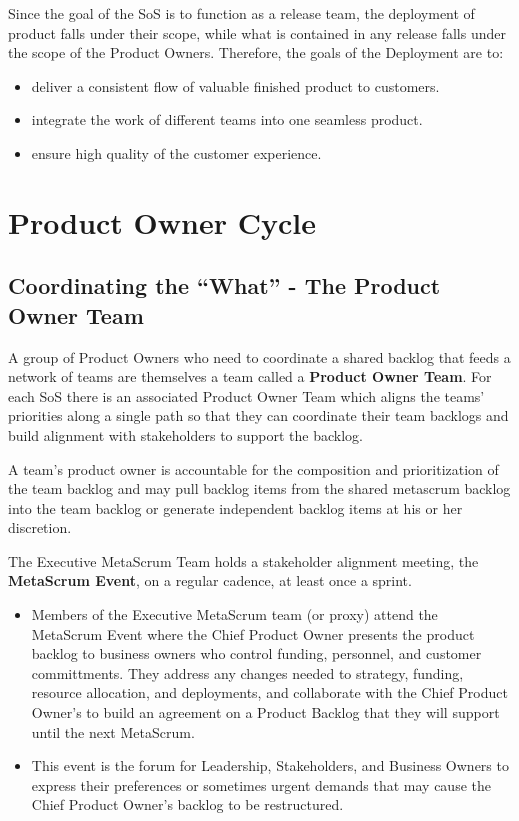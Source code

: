\documentclass[12pt,a4paper,parskip=full]{scrartcl}
\begin{document}
Since the goal of the SoS is to function as a release team, the deployment
of product falls under their scope, while what is contained in any release
falls under the scope of the Product Owners. Therefore, the goals of the
Deployment are to:
\begin{itemize}
\item deliver a consistent flow of valuable finished product to customers.
\item integrate the work of different teams into one seamless product.
\item ensure high quality of the customer experience.
\end{itemize}

\section{Product Owner Cycle}
\subsection{Coordinating the ``What'' - The Product Owner Team}
A group of Product Owners who need to coordinate a shared backlog that
feeds a network of teams are themselves a team called a \textbf{Product Owner Team}.
For each SoS there is an associated Product Owner Team which aligns the
teams' priorities along a single path so that they can coordinate their
team backlogs and build alignment with stakeholders to support the backlog.

A team's product owner is accountable for the composition and prioritization
of the team backlog and may pull backlog items from the shared metascrum backlog
into the team backlog or generate independent backlog items at his or her discretion.

The Executive MetaScrum Team holds a stakeholder alignment meeting, the \textbf{MetaScrum Event}, on a regular cadence, at least once a sprint. 
\begin{itemize}
\item Members of the Executive MetaScrum team (or proxy) attend the MetaScrum Event where the Chief Product Owner presents the product backlog to business owners who control funding, personnel, and customer committments. They address any changes needed to strategy, funding, resource allocation, and deployments, and collaborate with the Chief Product Owner's to build an agreement on a Product Backlog that they will support until the next MetaScrum.
\item This event is the forum for Leadership, Stakeholders, and Business Owners to express their preferences or sometimes urgent demands that may cause the Chief Product Owner's backlog to be restructured.
\end{itemize}
\end{document}
